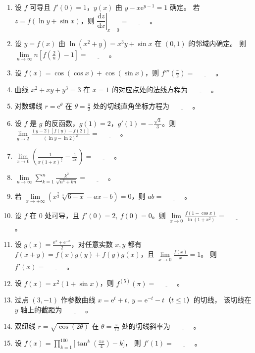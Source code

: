 \documentclass[UTF8,a4paper,zihao=-4,fontset=fandol]{ctexart}
\renewcommand{\lim}{\operatorname*{lim}\limits}
\newcommand{\blank}{\underline{\hspace{3em}}}
\begin{document}
\begin{enumerate}[start=22]
则 $\displaystyle\lim_{x\to0}f'(x)=\blank$。
\item 设 $f$ 可导且 $f'(0)=1$，$y(x)$ 由 $y-x\mathrm{e}^{y-1}=1$ 确定。
若 $z=f(\ln y+\sin x)$，则 $\left.\dfrac{\mathrm{d}z}{\mathrm{d}x}\right|_{x=0}=\blank$。
\item 设 $y=f(x)$ 由 $\ln(x^2+y)=x^3y+\sin x$ 在 $(0,1)$ 的邻域内确定。
则 $\displaystyle\lim_{n\to\infty}n[f(\frac{2}{n})-1]=\blank$。
\item 设 $f(x)=\cos(\cos x)+\cos(\sin x)$，则 $f'''(\frac{\pi}{2})=\blank$。
\item 曲线 $x^2+xy+y^3=3$ 在 $x=1$ 的对应点处的法线方程为 $\blank$。
\item 对数螺线 $r=\mathrm{e}^{\theta}$ 在 $\theta=\frac{\pi}{2}$ 处的切线直角坐标方程为 $\blank$。
\item 设 $f$ 是 $g$ 的反函数，$g(1)=2$，$g'(1)=-\frac{\sqrt{3}}{3}$。则
$\displaystyle\lim_{y\to2}\frac{(y-2)[f(y)-f(2)]}{(\ln y-\ln 2)^2}=\blank$。
\item $\displaystyle\lim_{x\to0}\left(\frac{1}{x(1+x)^{\frac{1}{x}}}-\frac1{x\mathrm e}\right)=\blank$。
\item $\displaystyle\lim_{n\to\infty}\sum_{k=1}^{n}\frac{k^2}{\sqrt{n^6+kn}}=\blank$。
\item 若 $\displaystyle\lim_{x\to+\infty}\left(x^{\frac{2}{3}}\sqrt[3]{6-x}-ax-b\right)=0$，则 $ab=\blank$。
\item 设 $f$ 在 $0$ 处可导，且 $f'(0)=2,\ f(0)=0$。则
$\displaystyle\lim_{x\to0}\frac{f(1-\cos x)}{\ln(1+x^2)}=\blank$。
\item 设 $g(x)=\frac{\mathrm{e}^x+\mathrm{e}^{-x}}{2}$，对任意实数 $x,y$ 都有
$f(x+y)=f(x)g(y)+f(y)g(x)$，且 $\displaystyle\lim_{x\to0} \frac{f(x)}{x}=1$。
则 $f'(x)=\blank$。
\item 设 $f(x)=x^2(1+\sin x)$，则 $f^{(5)}(\pi)=\blank$。
\item 过点 $(3,-1)$ 作参数曲线 $x=\mathrm{e}^t+t,\ y=\mathrm{e}^{-t}-t$（$t\le1$）的切线，
该切线在 $y$ 轴上的截距为 $\blank$。
\item 双纽线 $r=\sqrt{\cos(2\theta)}$ 在 $\theta=\frac{\pi}{12}$ 处的切线斜率为 $\blank$。
\item 设 $f(x)=\displaystyle\prod_{k=1}^{100}\big[\tan^k(\frac{\pi x}{4})-k\big]$，
则 $f'(1)=\blank$。
\end{enumerate}
\end{document}
